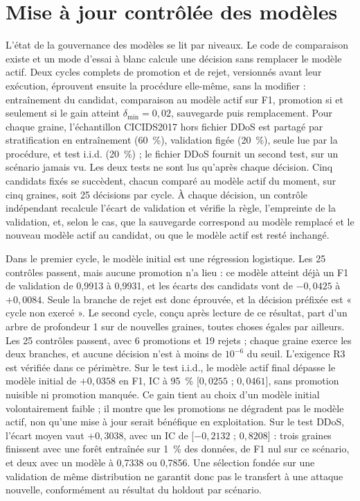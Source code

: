 \section{Mise à jour contrôlée des modèles}

\label{sec:r3-cycle}
L’état de la gouvernance des modèles se lit par niveaux. Le code de comparaison existe et un mode d'essai à blanc calcule une décision sans remplacer le modèle actif. Deux cycles complets de promotion et de rejet, versionnés avant leur exécution, éprouvent ensuite la procédure elle-même, sans la modifier : entraînement du candidat, comparaison au modèle actif sur F1, promotion si et seulement si le gain atteint $\delta_{\min} = 0{,}02$, sauvegarde puis remplacement. Pour chaque graine, l'échantillon CICIDS2017 hors fichier DDoS est partagé par stratification en entraînement (60~\%), validation figée (20~\%), seule lue par la procédure, et test i.i.d. (20~\%) ; le fichier DDoS fournit un second test, sur un scénario jamais vu. Les deux tests ne sont lus qu'après chaque décision. Cinq candidats fixés se succèdent, chacun comparé au modèle actif du moment, sur cinq graines, soit 25 décisions par cycle. À chaque décision, un contrôle indépendant recalcule l'écart de validation et vérifie la règle, l'empreinte de la validation, et, selon le cas, que la sauvegarde correspond au modèle remplacé et le nouveau modèle actif au candidat, ou que le modèle actif est resté inchangé.

Dans le premier cycle, le modèle initial est une régression logistique. Les 25 contrôles passent, mais aucune promotion n'a lieu : ce modèle atteint déjà un F1 de validation de 0,9913 à 0,9931, et les écarts des candidats vont de $-0{,}0425$ à $+0{,}0084$. Seule la branche de rejet est donc éprouvée, et la décision préfixée est « cycle non exercé ». Le second cycle, conçu après lecture de ce résultat, part d'un arbre de profondeur 1 sur de nouvelles graines, toutes choses égales par ailleurs. Les 25 contrôles passent, avec 6 promotions et 19 rejets ; chaque graine exerce les deux branches, et aucune décision n'est à moins de $10^{-6}$ du seuil. L'exigence R3 est vérifiée dans ce périmètre. Sur le test i.i.d., le modèle actif final dépasse le modèle initial de $+0{,}0358$ en F1, IC à 95~\% [$0{,}0255$ ; $0{,}0461$], sans promotion nuisible ni promotion manquée. Ce gain tient au choix d'un modèle initial volontairement faible ; il montre que les promotions ne dégradent pas le modèle actif, non qu'une mise à jour serait bénéfique en exploitation. Sur le test DDoS, l'écart moyen vaut $+0{,}3038$, avec un IC de [$-0{,}2132$ ; $0{,}8208$] : trois graines finissent avec une forêt entraînée sur 1~\% des données, de F1 nul sur ce scénario, et deux avec un modèle à 0,7338 ou 0,7856. Une sélection fondée sur une validation de même distribution ne garantit donc pas le transfert à une attaque nouvelle, conformément au résultat du holdout par scénario.

